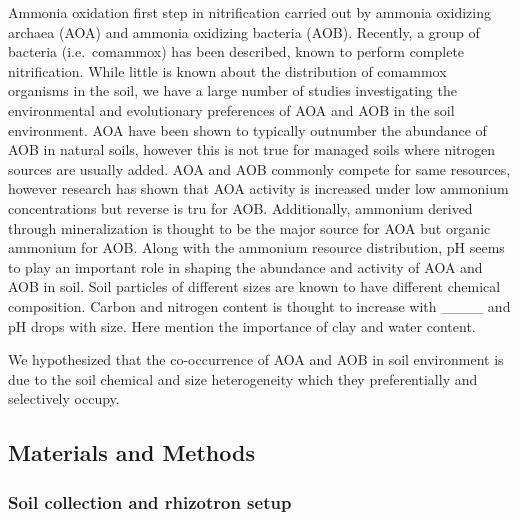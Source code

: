 \documentclass[
]{article}
\begin{document}
Ammonia oxidation first step in nitrification carried out by ammonia
oxidizing archaea (AOA) and ammonia oxidizing bacteria (AOB). Recently,
a group of bacteria (i.e.~comammox) has been described, known to perform
complete nitrification. While little is known about the distribution of
comammox organisms in the soil, we have a large number of studies
investigating the environmental and evolutionary preferences of AOA and
AOB in the soil environment. AOA have been shown to typically outnumber
the abundance of AOB in natural soils, however this is not true for
managed soils where nitrogen sources are usually added. AOA and AOB
commonly compete for same resources, however research has shown that AOA
activity is increased under low ammonium concentrations but reverse is
tru for AOB. Additionally, ammonium derived through mineralization is
thought to be the major source for AOA but organic ammonium for AOB.
Along with the ammonium resource distribution, pH seems to play an
important role in shaping the abundance and activity of AOA and AOB in
soil. Soil particles of different sizes are known to have different
chemical composition. Carbon and nitrogen content is thought to increase
with \_\_\_\_ and pH drops with size. Here mention the importance of
clay and water content.

We hypothesized that the co-occurrence of AOA and AOB in soil
environment is due to the soil chemical and size heterogeneity which
they preferentially and selectively occupy.

\newpage

\hypertarget{materials-and-methods}{%
\subsection{Materials and Methods}\label{materials-and-methods}}

\hypertarget{soil-collection-and-rhizotron-setup}{%
\subsubsection{Soil collection and rhizotron
setup}\label{soil-collection-and-rhizotron-setup}}
\end{document}
